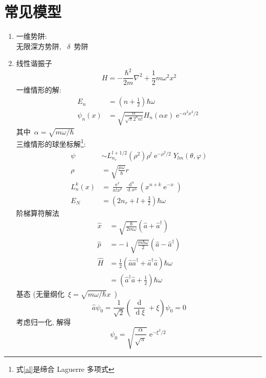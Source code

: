 \documentclass[11pt,a4paper,twocolumn,fleqn]{article}%
\DeclareMathOperator{\dif}{d}
\DeclareMathOperator{\mi}{i}
\DeclareMathOperator{\e}{e}%
\renewcommand{\[}{~$}
\renewcommand{\]}{$~}%
\begin{document}
\section{常见模型}
 \begin{enumerate}
 \setlength\abovedisplayskip{5pt} 
 \setlength\belowdisplayskip{3pt} 
 \setlength\itemsep{0pt}
 \item 一维势阱:\\
 	无限深方势阱, \[\delta\]势阱
 \item 线性谐振子
 	\begin{equation}
 	 H = -\frac{\hbar^2}{2m}\nabla^2 + \frac 12 m\omega^2x^2
 	\end{equation}
 	一维情形的解:
 	\begin{align}
 	 E_n &= \left( n+ \frac 12 \right)\hbar\omega \\
 	 \psi_n(x) &= \sqrt{\frac{\alpha}{\sqrt \pi 2^n n!}} H_n(\alpha x)\e^{-\alpha^2x^2/2}
 	\end{align}
 	其中\[\alpha = \sqrt{m\omega/\hbar}\]\\
 	三维情形的球坐标解\footnote{式\ref{al}是缔合 Laguerre 多项式}:
 	\begin{align}
 	 \psi &\sim L_{n_r}^{l+1/2}(\rho^2)\rho^l\e^{-\rho^2/2}Y_{lm}(\theta,\varphi) \\
 	 \rho &= \sqrt{\frac{\mu\omega}{\hbar}}r \\
 	 L_n^k(x) &= \frac{\e^x}{n!x^k}\frac{\dif^n}{\dif x^n}(x^{n+k}\e^{-x})\label{al}\\
 	 E_N &= \left(2n_r + l + \frac 32\right)\hbar\omega
 	\end{align}
 	阶梯算符解法
 	\begin{align}
 	 \hat x &= \sqrt{\frac{\hbar}{2m\omega}}(\hat a + \hat a^\dagger) \\
 	 \hat p &= -\mi\sqrt{\frac{m\hbar\omega}{2}}(\hat a - \hat a^\dagger) \\
 	 \hat H &= \frac{1}{2}(\hat a\hat a^\dagger + \hat a^\dagger\hat a)\hbar\omega \nonumber\\
 	 &= \left(\hat a^\dagger\hat a + \frac 12\right)\hbar\omega
 	\end{align}
 	基态 (无量纲化\[\xi = \sqrt{m\omega/\hbar}x\])
 	\begin{equation}
 	 \hat a \psi_0 = \frac{1}{\sqrt 2}\left(\frac{\dif}{\dif\xi}+\xi\right)\psi_0 = 0
 	\end{equation}
 	考虑归一化, 解得
 	\begin{equation}
 	 \psi_0 = \sqrt{\frac{\alpha}{\sqrt \pi}}\e^{-\xi^2/2}
 	\end{equation}

\end{enumerate}
\end{document}
